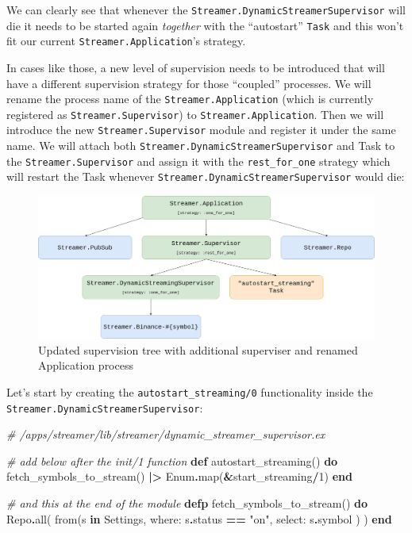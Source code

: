 \documentclass[
  oneside]{book}
\newenvironment{Shaded}{\begin{snugshade}}{\end{snugshade}}
\newcommand{\CommentTok}[1]{\textcolor[rgb]{0.56,0.35,0.01}{\textit{#1}}}
\newcommand{\ConstantTok}[1]{\textcolor[rgb]{0.00,0.00,0.00}{#1}}
\newcommand{\DecValTok}[1]{\textcolor[rgb]{0.00,0.00,0.81}{#1}}
\newcommand{\KeywordTok}[1]{\textcolor[rgb]{0.13,0.29,0.53}{\textbf{#1}}}
\newcommand{\NormalTok}[1]{#1}
\newcommand{\OperatorTok}[1]{\textcolor[rgb]{0.81,0.36,0.00}{\textbf{#1}}}
\newcommand{\StringTok}[1]{\textcolor[rgb]{0.31,0.60,0.02}{#1}}
\newcommand{\VariableTok}[1]{\textcolor[rgb]{0.00,0.00,0.00}{#1}}
\begin{document}
We can clearly see that whenever the \texttt{Streamer.DynamicStreamerSupervisor} will die it needs to be started again \emph{together} with the ``autostart'' \texttt{Task} and this won't fit our current \texttt{Streamer.Application}'s strategy.

In cases like those, a new level of supervision needs to be introduced that will have a different supervision strategy for those ``coupled'' processes. We will rename the process name of the \texttt{Streamer.Application} (which is currently registered as \texttt{Streamer.Supervisor}) to \texttt{Streamer.Application}. Then we will introduce the new \texttt{Streamer.Supervisor} module and register it under the same name. We will attach both \texttt{Streamer.DynamicStreamerSupervisor} and Task to the \texttt{Streamer.Supervisor} and assign it with the \texttt{rest\_for\_one} strategy which will restart the Task whenever \texttt{Streamer.DynamicStreamerSupervisor} would die:

\begin{figure}
\centering
\includegraphics{images/chapter_11_04_new_sup_tree.png}
\caption{Updated supervision tree with additional superviser and renamed Application process}
\end{figure}

Let's start by creating the \texttt{autostart\_streaming/0} functionality inside the \texttt{Streamer.DynamicStreamerSupervisor}:

\begin{Shaded}
\begin{Highlighting}[]
  \CommentTok{\# /apps/streamer/lib/streamer/dynamic\_streamer\_supervisor.ex}

  \CommentTok{\# add below after the \textasciigrave{}init/1\textasciigrave{} function}
  \KeywordTok{def}\NormalTok{ autostart\_streaming() }\KeywordTok{do}
\NormalTok{    fetch\_symbols\_to\_stream()}
    \OperatorTok{|\textgreater{}} \ConstantTok{Enum}\OperatorTok{.}\NormalTok{map(}\OperatorTok{\&}\NormalTok{start\_streaming}\OperatorTok{/}\DecValTok{1}\NormalTok{)}
  \KeywordTok{end}

  \CommentTok{\# and this at the end of the module}
  \KeywordTok{defp}\NormalTok{ fetch\_symbols\_to\_stream() }\KeywordTok{do}
    \ConstantTok{Repo}\OperatorTok{.}\NormalTok{all(}
\NormalTok{      from(s }\KeywordTok{in} \ConstantTok{Settings}\NormalTok{,}
        \VariableTok{where:}\NormalTok{ s}\OperatorTok{.}\NormalTok{status }\OperatorTok{==} \StringTok{"on"}\NormalTok{,}
        \VariableTok{select:}\NormalTok{ s}\OperatorTok{.}\NormalTok{symbol}
\NormalTok{      )}
\NormalTok{    )}
  \KeywordTok{end}
\end{Highlighting}
\end{Shaded}
\end{document}

